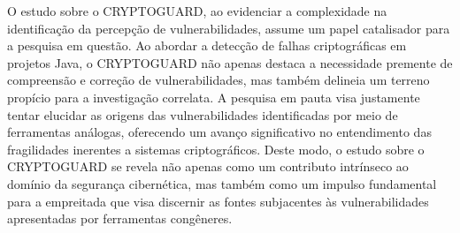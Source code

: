 
O estudo sobre o CRYPTOGUARD, ao evidenciar a complexidade na identificação da percepção de vulnerabilidades, assume um papel catalisador para a pesquisa em questão. Ao abordar a detecção de falhas criptográficas em projetos Java, o CRYPTOGUARD não apenas destaca a necessidade premente de compreensão e correção de vulnerabilidades, mas também delineia um terreno propício para a investigação correlata. A pesquisa em pauta visa justamente tentar elucidar as origens das vulnerabilidades identificadas por meio de ferramentas análogas, oferecendo um avanço significativo no entendimento das fragilidades inerentes a sistemas criptográficos. Deste modo, o estudo sobre o CRYPTOGUARD se revela não apenas como um contributo intrínseco ao domínio da segurança cibernética, mas também como um impulso fundamental para a empreitada que visa discernir as fontes subjacentes às vulnerabilidades apresentadas por ferramentas congêneres.





